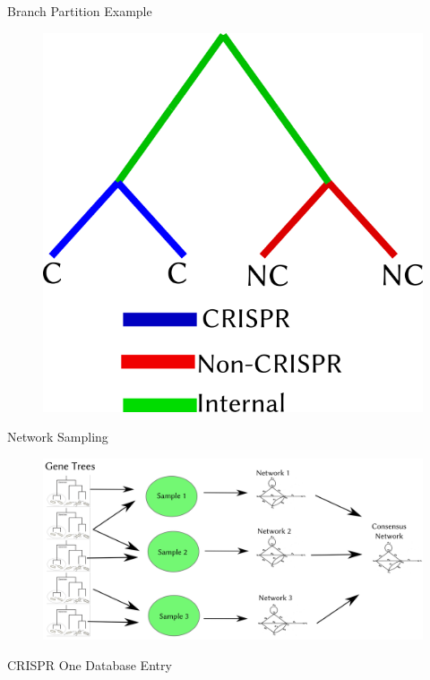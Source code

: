 \documentclass[dvipsnames]{beamer}
\begin{document}
\begin{frame}[fragile]{Branch Partition Example}
    \begin{figure}[htb!]
        \includegraphics[width=0.5\linewidth]{partition_example.png}
    \end{figure}
\end{frame}
\begin{frame}[fragile]{Network Sampling}
    \begin{figure}[htb!]
        \includegraphics[width=\linewidth]{netsample.png}
    \end{figure}
\end{frame}
\begin{frame}[fragile]{CRISPR One Database Entry}
    \begin{figure}[htb!]
    \end{figure}
\end{frame}
\end{document}
